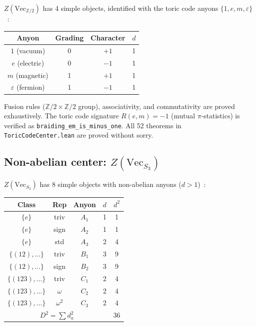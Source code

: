 \documentclass[aps,prl,twocolumn,superscriptaddress]{revtex4-2}
\begin{document}
$Z(\mathrm{Vec}_{\mathbb{Z}/2})$ has 4 simple objects, identified with the
toric code anyons $\{1, e, m, \varepsilon\}$~\cite{Kitaev2003}:

\begin{center}
\begin{tabular}{cccc}
\hline
Anyon & Grading & Character & $d$ \\
\hline
$1$ (vacuum) & 0 & $+1$ & 1 \\
$e$ (electric) & 0 & $-1$ & 1 \\
$m$ (magnetic) & 1 & $+1$ & 1 \\
$\varepsilon$ (fermion) & 1 & $-1$ & 1 \\
\hline
\end{tabular}
\end{center}

Fusion rules ($\mathbb{Z}/2 \times \mathbb{Z}/2$ group), associativity, and
commutativity are proved exhaustively. The toric code signature
$R(e,m) = -1$ (mutual $\pi$-statistics) is verified as
\texttt{braiding\_em\_is\_minus\_one}. All 52 theorems in
\texttt{ToricCodeCenter.lean} are proved without sorry.

\subsection{Non-abelian center: $Z(\mathrm{Vec}_{S_3})$}

$Z(\mathrm{Vec}_{S_3})$ has 8 simple objects with non-abelian anyons
($d > 1$)~\cite{DPR1991}:

\begin{center}
\begin{tabular}{ccccc}
\hline
Class & Rep & Anyon & $d$ & $d^2$ \\
\hline
$\{e\}$ & triv & $A_1$ & 1 & 1 \\
$\{e\}$ & sign & $A_2$ & 1 & 1 \\
$\{e\}$ & std & $A_3$ & 2 & 4 \\
$\{(12),\ldots\}$ & triv & $B_1$ & 3 & 9 \\
$\{(12),\ldots\}$ & sign & $B_2$ & 3 & 9 \\
$\{(123),\ldots\}$ & triv & $C_1$ & 2 & 4 \\
$\{(123),\ldots\}$ & $\omega$ & $C_2$ & 2 & 4 \\
$\{(123),\ldots\}$ & $\omega^2$ & $C_3$ & 2 & 4 \\
\hline
\multicolumn{4}{c}{$D^2 = \sum d_a^2$} & 36 \\
\hline
\end{tabular}
\end{center}
\end{document}
